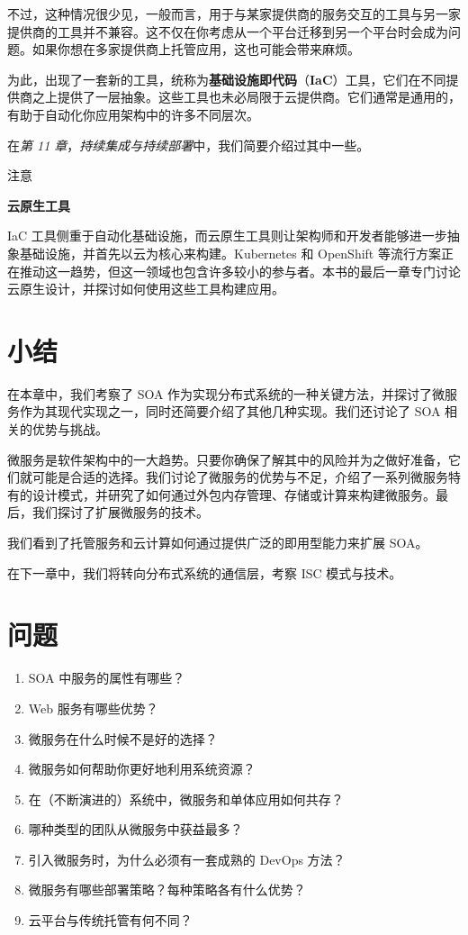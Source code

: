 不过，这种情况很少见，一般而言，用于与某家提供商的服务交互的工具与另一家提供商的工具并不兼容。这不仅在你考虑从一个平台迁移到另一个平台时会成为问题。如果你想在多家提供商上托管应用，这也可能会带来麻烦。

\label{idx:1480}
为此，出现了一套新的工具，统称为\textbf{基础设施即代码}（\textbf{IaC}）工具，它们在不同提供商之上提供了一层抽象。这些工具也未必局限于云提供商。它们通常是通用的，有助于自动化你应用架构中的许多不同层次。

在\emph{第 11 章}，\emph{持续集成与持续部署}中，我们简要介绍过其中一些。

\begin{myNotic}{注意}

\textbf{云原生工具}

\label{idx:1481}
IaC 工具侧重于自动化基础设施，而云原生工具则让架构师和开发者能够进一步抽象基础设施，并首先以云为核心来构建。Kubernetes 和 OpenShift 等流行方案正在推动这一趋势，但这一领域也包含许多较小的参与者。本书的最后一章专门讨论云原生设计，并探讨如何使用这些工具构建应用。
\end{myNotic}

\section{小结}

在本章中，我们考察了 SOA 作为实现分布式系统的一种关键方法，并探讨了微服务作为其现代实现之一，同时还简要介绍了其他几种实现。我们还讨论了 SOA 相关的优势与挑战。

微服务是软件架构中的一大趋势。只要你确保了解其中的风险并为之做好准备，它们就可能是合适的选择。我们讨论了微服务的优势与不足，介绍了一系列微服务特有的设计模式，并研究了如何通过外包内存管理、存储或计算来构建微服务。最后，我们探讨了扩展微服务的技术。

我们看到了托管服务和云计算如何通过提供广泛的即用型能力来扩展 SOA。

在下一章中，我们将转向分布式系统的通信层，考察 ISC 模式与技术。

\section{问题}

\begin{enumerate}
\item SOA 中服务的属性有哪些？
\item Web 服务有哪些优势？
\item 微服务在什么时候不是好的选择？
\item 微服务如何帮助你更好地利用系统资源？
\item 在（不断演进的）系统中，微服务和单体应用如何共存？
\item 哪种类型的团队从微服务中获益最多？
\item 引入微服务时，为什么必须有一套成熟的 DevOps 方法？
\item 微服务有哪些部署策略？每种策略各有什么优势？
\item 云平台与传统托管有何不同？
\end{enumerate}


